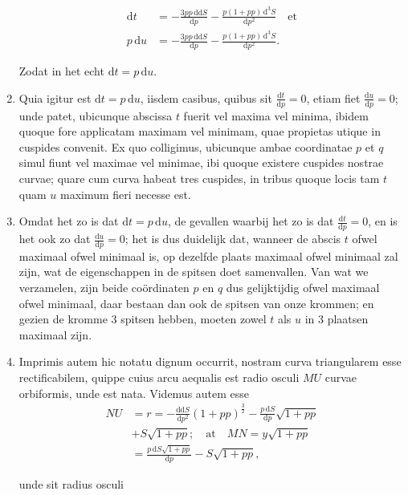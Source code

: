 \documentclass[10pt,a4paper]{article}
\newcommand{\switchenum}{\setcounter{enumi}{\arabic{enumi}-1}\switchcolumn}
\def\D{\mathrm{d}}
\begin{document}
\begin{paracol}{2}
\begin{enumerate}[topsep=1px]
		\begin{align*}
			\D t &= -\frac{3pp\, \D\D S}{\D p}-\frac{p(1+pp)\, \D^3S}{\D p^2} \quad \text{et}\\
			p\, \D u &= - \frac{3pp \, \D \D S}{\D p} - \frac{p(1+pp)\, \D^3S}{\D p^2}.
		\end{align*}
		\par Zodat in het echt $\D t=p\, \D u$.
		
		\switchcolumn*
		
		\item Quia igitur est $\D t=p \,\D u$, iisdem casibus, quibus sit $\frac{\D t}{\D p}=0$, etiam fiet $\frac{\D u}{\D p}= 0$; unde patet, ubicunque abscissa $t$ fuerit vel maxima vel minima, ibidem quoque fore applicatam maximam vel minimam, quae propietas utique in cuspides convenit. Ex quo colligimus, ubicunque ambae coordinatae $p$ et $q$ simul fiunt vel maximae vel minimae, ibi quoque existere cuspides nostrae curvae; quare cum curva habeat tres cuspides, in tribus quoque locis tam $t$ quam $u$ maximum fieri necesse est.
		
		\switchenum
		\item Omdat het zo is dat $\D t=p\, \D u$, de gevallen waarbij het zo is dat $\frac{\D t}{\D p}=0$, en is het ook zo dat $\frac{\D u}{\D p}= 0$; het is dus duidelijk dat, wanneer de abscis $t$ ofwel maximaal ofwel minimaal is, op dezelfde plaats maximaal ofwel minimaal zal zijn, wat de eigenschappen in de spitsen doet samenvallen. Van wat we verzamelen, zijn beide coördinaten $p$ en $q$ dus gelijktijdig ofwel maximaal ofwel minimaal, daar bestaan dan ook de spitsen van onze krommen; en gezien de kromme 3 spitsen hebben, moeten zowel $t$ als $u$ in 3 plaatsen maximaal zijn.
		
		\switchcolumn*
		
		\item Imprimis autem hic notatu dignum occurrit, nostram curva triangularem esse rectificabilem, quippe cuius arcu aequalis est radio osculi $MU$ curvae orbiformis, unde est nata. Videmus autem esse
		\begin{align*}
			NU &= r = -\frac{\D \D S}{\D p^2}(1+pp)^\frac{3}{2}-\frac{p\,\D S}{\D p}\sqrt{1+pp}\\
			& +S\sqrt{1+pp}; \quad \text{at} \quad MN = y\sqrt{1+pp}\\
			&= \frac{p\, \D S\sqrt{1+pp}}{\D p}-S\sqrt{1+pp},
		\end{align*}
		
		unde sit radius osculi
		

\end{enumerate}
\end{paracol}
\end{document}
